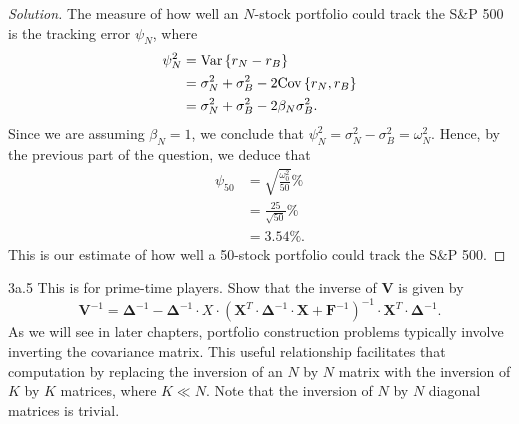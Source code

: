\begin{proof}[Solution]
The measure of how well an $N$-stock portfolio could track the S\&P 500 is the tracking error $\psi_{N}$, where
\begin{align*}
\psi_{N}^{2} &= \mathrm{Var}\left\lbrace r_{N} - r_{B}\right\rbrace\\
&= \sigma_{N}^{2} + \sigma_{B}^{2} - 2\mathrm{Cov}\left\lbrace r_{N},r_{B}\right\rbrace\\
&= \sigma_{N}^{2} + \sigma_{B}^{2} - 2\beta_{N}\sigma_{B}^{2}.
\end{align*}
Since we are assuming $\beta_{N} = 1$, we conclude that $\psi_{N}^{2} = \sigma_{N}^{2} - \sigma_{B}^{2} = \omega_{N}^{2}$. Hence, by the previous part of the question, we deduce that
\begin{align*}
\psi_{50} &= \sqrt{\frac{\omega_{0}^{2}}{50}}\%\\
&= \frac{25}{\sqrt{50}}\%\\
&= 3.54\%.
\end{align*}
This is our estimate of how well a 50-stock portfolio could track the S\&P 500.
\end{proof}


\begin{problem}{3a.5}
This is for prime-time players. Show that the inverse of $\mathbf{V}$ is given by \[\mathbf{V}^{-1} = \bm{\Delta}^{-1} - \bm{\Delta}^{-1} \cdot X \cdot (\mathbf{X}^{T} \cdot \bm{\Delta}^{-1} \cdot \mathbf{X} + \mathbf{F}^{-1})^{-1} \cdot \mathbf{X}^{T} \cdot \bm{\Delta}^{-1}.\] As we will see in later chapters, portfolio construction problems typically involve inverting the
covariance matrix. This useful relationship facilitates that computation by replacing the inversion of an $N$ by $N$ matrix with the inversion of $K$ by $K$ matrices, where $K \ll N$. Note that the inversion of $N$ by $N$ diagonal matrices is trivial.
\end{problem}

